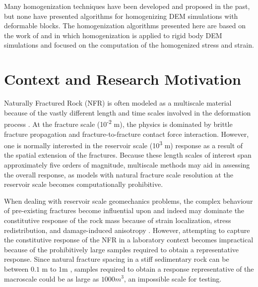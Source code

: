 Many homogenization techniques have been developed and proposed in the past, but none have presented algorithms for homogenizing DEM simulations with deformable blocks. The homogenization algorithms presented here are based on the work of \citet{daddetta_particle_2004} and \citet{wellmann_homogenization_2008} in which homogenization is applied to rigid body DEM simulations and focused on the computation of the homogenized stress and strain. 

\section{Context and Research Motivation}

Naturally Fractured Rock (NFR) is often modeled as a multiscale material because of the vastly different length and time scales involved in the deformation process \citep{zhou_flow_2003}. At the fracture scale (10\textsuperscript{-2} m), the physics is dominated by brittle fracture propagation and fracture-to-fracture contact force interaction. However, one is normally interested in the reservoir scale (10\textsuperscript{3} m) response as a result of the spatial extension of the fractures. Because these length scales of interest span approximately five orders of magnitude, multiscale methods may aid in assessing the overall response, as models with natural fracture scale resolution at the reservoir scale becomes computationally prohibitive.

When dealing with reservoir scale geomechanics problems, the complex behaviour of pre-existing fractures become influential upon and indeed may dominate the constitutive response of the rock mass because of strain localization, stress redistribution, and damage-induced anisotropy \citep{Petracca_2015}. However, attempting to capture the constitutive response of the NFR in a laboratory context becomes impractical because of the prohibitively large samples required to obtain a representative response. Since natural fracture spacing in a stiff sedimentary rock can be between $0.1$ m to $1$m \citep{Nelson_2001}, samples required to obtain a response representative of the macroscale could be as large as $1000 m^3$, an impossible scale for testing. 

